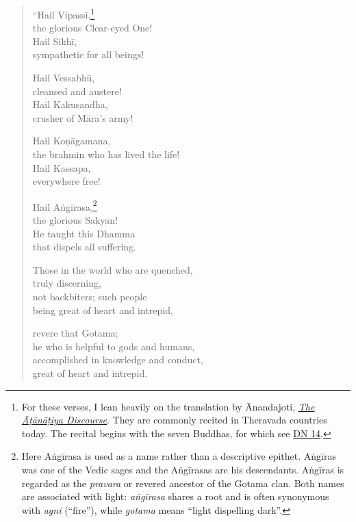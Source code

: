 \documentclass[12pt,openany]{book}%
\begin{document}
\begin{verse}%
“Hail \textsanskrit{Vipassī},\footnote{For these verses, I lean heavily on the translation by Ānandajoti, \emph{\href{https://suttacentral.nethttps://www.ancient-buddhist-texts.net/Texts-and-Translations/Safeguard/03-Tatiyakabhanavaram.htm}{The Āṭānāṭiya Discourse}}. They are commonly recited in Theravada countries today. The recital begins with the seven Buddhas, for which see \href{https://suttacentral.net/dn14/en/sujato}{DN 14}. } \\
the glorious Clear-eyed One! \\
Hail \textsanskrit{Sikhī}, \\
sympathetic for all beings! 

Hail \textsanskrit{Vessabhū}, \\
cleansed and austere! \\
Hail Kakusandha, \\
crusher of \textsanskrit{Māra}’s army! 

Hail \textsanskrit{Koṇāgamana}, \\
the brahmin who has lived the life! \\
Hail Kassapa, \\
everywhere free! 

Hail \textsanskrit{Aṅgīrasa},\footnote{Here \textsanskrit{Aṅgīrasa} is used as a name rather than a descriptive epithet. \textsanskrit{Aṅgīras} was one of the Vedic sages and the \textsanskrit{Aṅgīrasas} are his descendants. \textsanskrit{Aṅgīras} is regarded as the \textit{pravara} or revered ancestor of the Gotama clan. Both names are associated with light: \textit{\textsanskrit{aṅgīrasa}} shares a root and is often synonymous with \textit{agni} (“fire”), while \textit{gotama} means “light dispelling dark”. } \\
the glorious Sakyan! \\
He taught this Dhamma \\
that dispels all suffering. 

Those in the world who are quenched, \\
truly discerning, \\
not backbiters; such people \\
being great of heart and intrepid, 

revere that Gotama; \\
he who is helpful to gods and humans, \\
accomplished in knowledge and conduct, \\
great of heart and intrepid. 


\end{verse}
\end{document}
